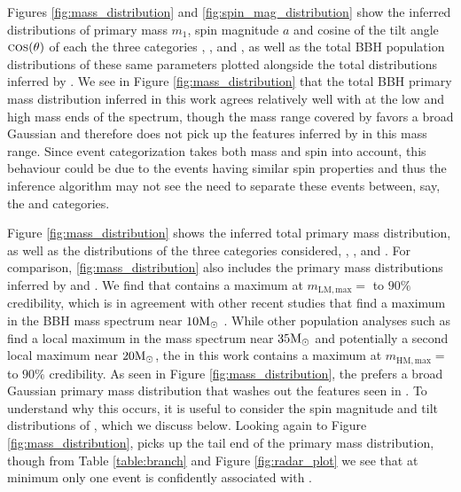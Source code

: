 Figures \ref{fig:mass_distribution} and \ref{fig:spin_mag_distribution} show the inferred distributions of primary mass $m_1$, spin magnitude $a$ and cosine of the tilt angle $\textsc{cos}(\theta)$ of each the three categories \first{}, \second{}, and \cont{}, as well as the total BBH population distributions of these same parameters plotted alongside the total distributions inferred by . We see in Figure \ref{fig:mass_distribution} that the total BBH primary mass distribution inferred in this work agrees relatively well with  at the low and high mass ends of the spectrum, though the mass range covered by \second{} favors a broad Gaussian and therefore does not pick up the features inferred by  in this mass range. Since event categorization takes both mass and spin into account, this behaviour could be due to the \second{} events having similar spin properties and thus the inference algorithm may not see the need to separate these events between, say, the \second{} and \cont{} categories. 

Figure \ref{fig:mass_distribution} shows the inferred total primary mass distribution, as well as the distributions of the three categories considered, \first{}, \second{}, and \cont{}. For comparison, \ref{fig:mass_distribution} also includes the primary mass distributions inferred by  and . We find that \first{} contains a maximum at $m_\mathrm{LM,max} = $ \result{$\CIPlusMinus{\macros[Mass][LowMassPeak][max]}\msun$}  to $90\%$ credibility, which is in agreement with other recent studies that find a maximum in the BBH mass spectrum near $10 {\rm M}_\odot$ . While other population analyses such as  find a local maximum in the mass spectrum near $35{\rm M}_\odot$ and potentially a second local maximum near $20{\rm M}_\odot$, the \second{} in this work contains a maximum at $m_\mathrm{HM,max} = $ \result{$\CIPlusMinus{\macros[Mass][HighMassPeak][max]}\msun$}  to $90\%$ credibility. As seen in Figure \ref{fig:mass_distribution}, the \second{} prefers a broad Gaussian primary mass distribution that washes out the features seen in . To understand why this occurs, it is useful to consider the spin magnitude and tilt distributions of \second{}, which we discuss below. Looking again to Figure \ref{fig:mass_distribution}, \cont{} picks up the tail end of the primary mass distribution, though from Table \ref{table:branch} and Figure \ref{fig:radar_plot} we see that at minimum only one event is confidently associated with \cont{}. 

